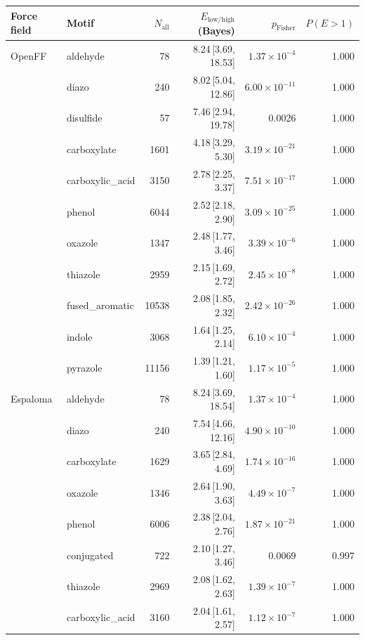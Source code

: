 \begin{table}[t]
  \centering
  \small
  \setlength{\tabcolsep}{6pt}
  \renewcommand{\arraystretch}{1.15}
  \begin{tabular}{llrrrr}
    \hline
    Force field & Motif & $N_\mathrm{all}$ & $E_{\mathrm{low/high}}$ (Bayes) & $p_\mathrm{Fisher}$ & $P(E>1)$ \\
    \hline
    OpenFF & aldehyde & 78 & 8.24\,[3.69, 18.53] & $1.37\times 10^{-4}$ & 1.000 \\
      & diazo & 240 & 8.02\,[5.04, 12.86] & $6.00\times 10^{-11}$ & 1.000 \\
      & disulfide & 57 & 7.46\,[2.94, 19.78] & 0.0026 & 1.000 \\
      & carboxylate & 1601 & 4.18\,[3.29, 5.30] & $3.19\times 10^{-21}$ & 1.000 \\
      & carboxylic\_acid & 3150 & 2.78\,[2.25, 3.37] & $7.51\times 10^{-17}$ & 1.000 \\
      & phenol & 6044 & 2.52\,[2.18, 2.90] & $3.09\times 10^{-25}$ & 1.000 \\
      & oxazole & 1347 & 2.48\,[1.77, 3.46] & $3.39\times 10^{-6}$ & 1.000 \\
      & thiazole & 2959 & 2.15\,[1.69, 2.72] & $2.45\times 10^{-8}$ & 1.000 \\
      & fused\_aromatic & 10538 & 2.08\,[1.85, 2.32] & $2.42\times 10^{-26}$ & 1.000 \\
      & indole & 3068 & 1.64\,[1.25, 2.14] & $6.10\times 10^{-4}$ & 1.000 \\
      & pyrazole & 11156 & 1.39\,[1.21, 1.60] & $1.17\times 10^{-5}$ & 1.000 \\
    \hline
    Espaloma & aldehyde & 78 & 8.24\,[3.69, 18.54] & $1.37\times 10^{-4}$ & 1.000 \\
      & diazo & 240 & 7.54\,[4.66, 12.16] & $4.90\times 10^{-10}$ & 1.000 \\
      & carboxylate & 1629 & 3.65\,[2.84, 4.69] & $1.74\times 10^{-16}$ & 1.000 \\
      & oxazole & 1346 & 2.64\,[1.90, 3.63] & $4.49\times 10^{-7}$ & 1.000 \\
      & phenol & 6006 & 2.38\,[2.04, 2.76] & $1.87\times 10^{-21}$ & 1.000 \\
      & conjugated & 722 & 2.10\,[1.27, 3.46] & 0.0069 & 0.997 \\
      & thiazole & 2969 & 2.08\,[1.62, 2.63] & $1.39\times 10^{-7}$ & 1.000 \\
      & carboxylic\_acid & 3160 & 2.04\,[1.61, 2.57] & $1.12\times 10^{-7}$ & 1.000 \\

\end{tabular}
\end{table}
